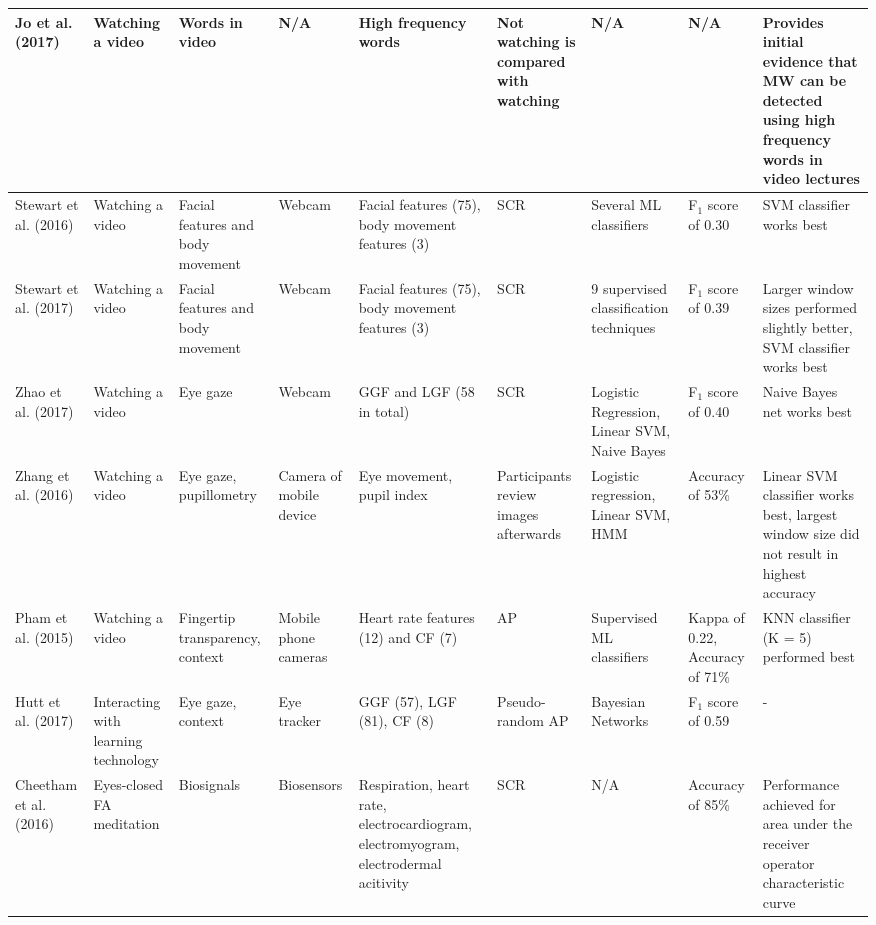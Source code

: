 \begin{ThreePartTable}
\begin{xtabular}{P{20mm}P{24mm}P{24mm}P{28mm}P{28mm}P{21mm}P{26mm}P{24mm}P{42mm}}
                Jo et al. (2017) \cite{Jo2017AMind} & Watching a video & Words in video & N/A & High frequency words & Not watching is compared with watching & N/A & N/A & Provides initial evidence that MW can be detected using high frequency words in video lectures\\ \midrule
                Stewart et al. (2016) \cite{Stewart2016WheresViewing} & Watching a video & Facial features and body movement & Webcam & Facial features (75), body movement features (3) & SCR & Several ML classifiers & F$_1$ score of 0.30 & SVM classifier works best\\ \midrule
                Stewart et al. (2017) \cite{Stewart2017FaceComprehension} & Watching a video & Facial features and body movement & Webcam & Facial features (75), body movement features (3) & SCR & 9 supervised classification techniques & F$_1$ score of 0.39 & Larger window sizes performed slightly better, SVM classifier works best\\ \midrule
                Zhao et al. (2017) \cite{Zhao2017ScalableApproach} & Watching a video & Eye gaze & Webcam & GGF and LGF (58 in total) & SCR & Logistic Regression, Linear SVM, Naive Bayes & F$_1$ score of 0.40 & Naive Bayes net works best\\ \midrule
                Zhang et al. (2016) \cite{ISI:000443429900018} & Watching a video & Eye gaze, pupillometry & Camera of mobile device & Eye movement, pupil index & Participants review images afterwards & Logistic regression, Linear SVM, HMM & Accuracy of 53\% & Linear SVM classifier works best, largest window size did not result in highest accuracy\\ \midrule
                Pham et al. (2015) \cite{Pham2015Attentivelearner:Tracking} & Watching a video & Fingertip transparency, context & Mobile phone cameras & Heart rate features (12) and CF (7) & AP & Supervised ML classifiers & Kappa of 0.22, Accuracy of 71\% & KNN classifier (K = 5) performed best\\ \midrule
                Hutt et al. (2017) \cite{Hutt2017OutClassroom} & Interacting with learning technology & Eye gaze, context & Eye tracker & GGF (57), LGF (81), CF (8) & Pseudo-random AP & Bayesian Networks & F$_1$ score of 0.59 & -\\ \midrule
                Cheetham et al. (2016) \cite{Cheetham2016AutomatedApplication} & Eyes-closed FA meditation & Biosignals & Biosensors & Respiration, heart rate, electrocardiogram, electromyogram, electrodermal acitivity & SCR & N/A & Accuracy of 85\% & Performance achieved for area under the receiver operator characteristic curve\\ \midrule

\end{xtabular}
\end{ThreePartTable}
